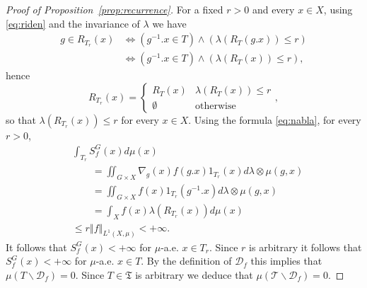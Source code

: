 \documentclass{amsart}
\numberwithin{equation}{subsection}
\begin{document}
\begin{proof}[Proof of Proposition~\ref{prop:recurrence}]
For a fixed \(r>0\) and every \(x\in X\), using \eqref{eq:riden} and the invariance of \(\lambda\) we have
\begin{align*}
g\in R_{T_{r}}\left(x\right)
&\iff\left(g^{-1}.x\in T\right)\wedge\left(\lambda\left(R_{T}\left(g.x\right)\right)\leq r\right)\\
&\iff\left(g^{-1}.x\in T\right)\wedge\left(\lambda\left(R_{T}\left(x\right)\right)\leq r\right),
\end{align*}
hence
\[R_{T_{r}}\left(x\right)=\begin{cases}
R_{T}\left(x\right) & \lambda\left(R_{T}\left(x\right)\right)\leq r\\
\emptyset & \text{otherwise}
\end{cases},\]
so that \(\lambda\left(R_{T_{r}}\left(x\right)\right)\leq r\) for every \(x\in X\). Using the formula \eqref{eq:nabla}, for every \(r>0\),
\begin{equation}
\label{eq:maharam}
\begin{aligned}
&\int_{T_{r}}S_{f}^{G}\left(x\right)d\mu\left(x\right)\\
&\qquad=\iint\nolimits_{G\times X}\nabla_{g}\left(x\right)f\left(g.x\right)1_{T_{r}}\left(x\right)d\lambda\otimes\mu\left(g,x\right)\\
&\qquad=\iint\nolimits_{G\times X}f\left(x\right)1_{T_{r}}\left(g^{-1}.x\right)d\lambda\otimes\mu\left(g,x\right)\\
&\qquad=\int_{X}f\left(x\right)\lambda\left(R_{T_{r}}\left(x\right)\right)d\mu\left(x\right)\\
&\leq r\left\Vert f\right\Vert_{L^{1}\left(X,\mu\right)}<+\infty.
\end{aligned}
\end{equation}
It follows that \(S_{f}^{G}\left(x\right)<+\infty\) for \(\mu\)-a.e. \(x\in T_{r}\). Since \(r\) is arbitrary it follows that \(S_{f}^{G}\left(x\right)<+\infty\) for \(\mu\)-a.e. \(x\in T\). By the definition of \(\mathcal{D}_{f}\) this implies that \(\mu\left(T\backslash\mathcal{D}_{f}\right)=0\). Since \(T\in\mathfrak{T}\) is arbitrary we deduce that \(\mu\left(\mathcal{T}\backslash\mathcal{D}_{f}\right)=0\).
\end{proof}
\end{document}
